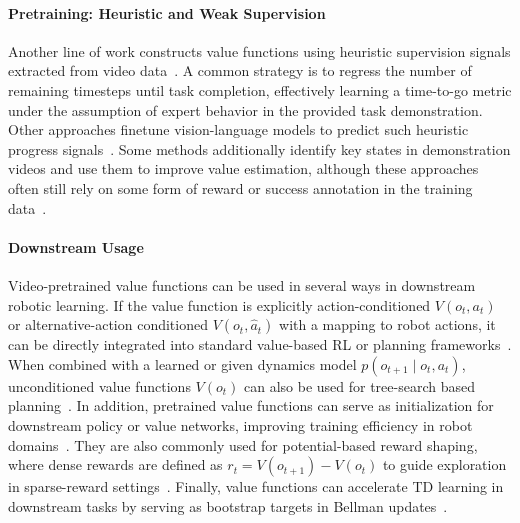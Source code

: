 \paragraph{Pretraining: Heuristic and Weak Supervision}

Another line of work constructs value functions using heuristic supervision signals extracted from video data~\cite{Edwards2019PerceptualVF}. A common strategy is to regress the number of remaining timesteps until task completion, effectively learning a time-to-go metric under the assumption of expert behavior in the provided task demonstration. Other approaches finetune vision-language models to predict such heuristic progress signals~\cite{Du2023VideoLP}.
Some methods additionally identify key states in demonstration videos and use them to improve value estimation, although these approaches often still rely on some form of reward or success annotation in the training data~\cite{Liu2023LearningTI}.




\paragraph{Downstream Usage}

Video-pretrained value functions can be used in several ways in downstream robotic learning. If the value function is explicitly action-conditioned $V(o_t, a_t)$~\cite{Chang2020SemanticVN} or alternative-action conditioned $V(o_t, \hat{a}_t)$ with a mapping to robot actions, it can be directly integrated into standard value-based \ac{RL} or planning frameworks~\cite{Chang2022LearningVF}. When combined with a learned or given dynamics model $p(o_{t+1} \mid o_t, a_t)$, unconditioned value functions $V(o_t)$ can also be used for tree-search based planning~\cite{Du2023VideoLP}.
In addition, pretrained value functions can serve as initialization for downstream policy or value networks, improving training efficiency in robot domains~\cite{Bhateja2023RoboticOR}. They are also commonly used for potential-based reward shaping, where dense rewards are defined as $r_t = V(o_{t+1}) - V(o_t)$ to guide exploration in sparse-reward settings~\cite{Edwards2019PerceptualVF, Ye2023ReinforcementLW, Chang2022LearningVF}. 
Finally, value functions can accelerate \ac{TD} learning in downstream tasks by serving as bootstrap targets in Bellman updates~\cite{Edwards2019PerceptualVF}.


